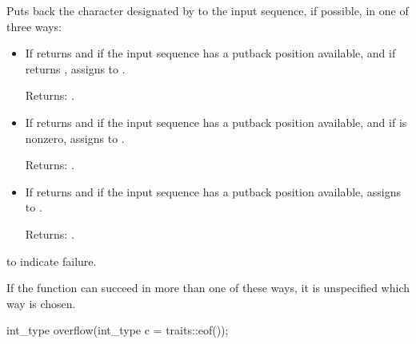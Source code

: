 \begin{itemdescr}
\pnum
\effects
Puts back the character designated by  to the input
sequence, if possible, in one of three ways:
\begin{itemize}
\item
If
returns
and
if the input sequence has a putback position available, and
if
returns
,
assigns
to
.

Returns:
.
\item
If
returns
and if the input sequence
has a putback position available, and
if 
\tcode{\&}
 is
nonzero,
assigns  to
.

Returns:
.
\item
If
returns
and if the input sequence has a putback position available,
assigns
to
.

Returns:
.
\end{itemize}

\pnum
\returns
{}
to indicate failure.

\pnum
\notes
If the function can succeed in more than one of these ways, it is
unspecified which way is chosen.
%
\end{itemdescr}

%
\begin{itemdecl}
int_type overflow(int_type c = traits::eof());
\end{itemdecl}

